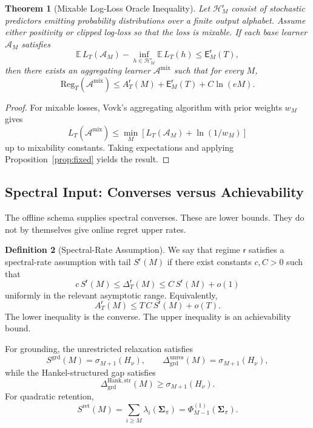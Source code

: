 \documentclass[12pt]{article}
\newtheorem{theorem}{Theorem}[section]
\theoremstyle{definition}
\newtheorem{definition}[theorem]{Definition}
\newcommand{\Hcal}{\mathcal H}
\newcommand{\Dunres}{\Delta_{\mathrm{grd}}^{\mathrm{unres}}}
\newcommand{\DHankstr}{\Delta_{\mathrm{grd}}^{\mathrm{Hank,str}}}
\newcommand{\Reg}{\mathrm{Reg}}
\newcommand{\Est}{\mathsf E}
\newcommand{\Aapp}{A_T}
\begin{document}
\begin{theorem}[Mixable Log-Loss Oracle Inequality]
\label{thm:oracle-logloss}
Let $\Hcal_M^{\mathsf r}$ consist of stochastic predictors emitting
probability distributions over a finite output alphabet.  Assume either
positivity or clipped log-loss so that the loss is mixable.  If each base
learner $\mathcal A_M$ satisfies
\[
\mathbb E\,L_T(\mathcal A_M)
-
\inf_{h\in\Hcal_M^{\mathsf r}}
\mathbb E\,L_T(h)
\le
\Est_M^{\mathsf r}(T),
\]
then there exists an aggregating learner $\mathcal A^{\mathrm{mix}}$ such that
for every $M$,
\[
\Reg_T(\mathcal A^{\mathrm{mix}})
\le
\Aapp^{\mathsf r}(M)
+
\Est_M^{\mathsf r}(T)
+
C\ln(eM).
\]
\end{theorem}

\begin{proof}
For mixable losses, Vovk's aggregating algorithm \cite{vovk1990} with prior weights $w_M$ gives
\[
L_T(\mathcal A^{\mathrm{mix}})
\le
\min_M
\left[
L_T(\mathcal A_M)+\ln(1/w_M)
\right]
\]
up to mixability constants.  Taking expectations and applying
Proposition~\ref{prop:fixed} yields the result.
\end{proof}

\subsection{Spectral Input: Converses versus Achievability}
\label{subsec:oracle-spectral}

The offline schema supplies spectral converses.  These are lower bounds.  They
do not by themselves give online regret upper rates.

\begin{definition}[Spectral-Rate Assumption]
\label{def:spectral-rate}
We say that regime $\mathsf r$ satisfies a spectral-rate assumption with tail
$S^{\mathsf r}(M)$ if there exist constants $c,C>0$ such that
\[
c\,S^{\mathsf r}(M)
\le
\Delta_T^{\mathsf r}(M)
\le
C\,S^{\mathsf r}(M)+o(1)
\]
uniformly in the relevant asymptotic range.  Equivalently,
\[
\Aapp^{\mathsf r}(M)
\le
T\,C\,S^{\mathsf r}(M)+o(T).
\]
The lower inequality is the converse.  The upper inequality is an
achievability bound.
\end{definition}

For grounding, the unrestricted relaxation satisfies
\[
S^{\mathrm{grd}}(M)
=
\sigma_{M+1}(H_\nu),
\qquad
\Dunres(M)
=
\sigma_{M+1}(H_\nu),
\]
while the Hankel-structured gap satisfies
\[
\DHankstr(M)
\ge
\sigma_{M+1}(H_\nu).
\]
For quadratic retention,
\[
S^{\mathrm{ret}}(M)
=
\sum_{i\ge M}\lambda_i(\bm{\Sigma}_\pi)
=
\Phi^{(1)}_{M-1}(\bm{\Sigma}_\pi).
\]
\end{document}

